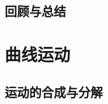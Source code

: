 \documentclass[color=purple,openany]{textbook-cn}
\begin{document}
\begin{Point}
\lipsum[2]
\end{Point}

\begin{Case}
\item \lipsum[1][3]
\item \lipsum[1][3]
\item \lipsum[1][3]
\item \lipsum[1][3]
\end{Case}

\begin{Link}
\zhlipsum[1]
\end{Link}




\section{回顾与总结}

\begin{Point}
\lipsum[2]
\end{Point}

\begin{Case*}
\item \lipsum[1][3]
\item \lipsum[1][3]
\item \lipsum[1][3]
\item \lipsum[1][3]
\end{Case*}

\begin{Link}
\zhlipsum[1]
\end{Link}


\chaptersaying{\lipsum[1][4]}
\chapter{曲线运动}


\begin{Block}[章节引入]
\lipsum[1-3]
\end{Block}

\section{运动的合成与分解}
\begin{Point}
\lipsum[2]
\end{Point}

\begin{Case}
\item \lipsum[1][3]
\item \lipsum[1][3]
\item \lipsum[1][3]
\item \lipsum[1][3]
\end{Case}
\end{document}
